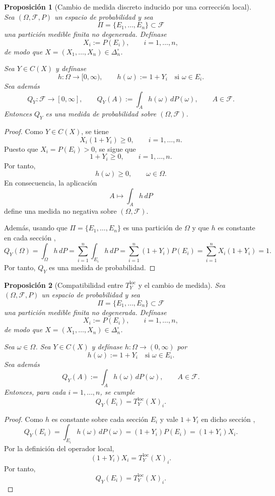 ﻿\documentclass[12pt]{article}
\newtheorem{proposicion}{Proposición}[section]
\begin{document}
\begin{proposicion}[Cambio de medida discreto inducido por una corrección local]\label{prop:QYprobabilidad}
Sea $(\Omega,\mathcal F,P)$ un espacio de probabilidad y sea
\[
\Pi=\{E_1,\dots,E_n\}\subset\mathcal F
\]
una partición medible finita no degenerada. Defínase
\[
X_i:=P(E_i),\qquad i=1,\dots,n,
\]
de modo que $X=(X_1,\dots,X_n)\in\Delta_n^\circ$.

Sea $Y\in C(X)$ y defínase
\[
h:\Omega\to[0,\infty),
\qquad
h(\omega):=1+Y_i
\quad\text{si }\omega\in E_i.
\]
Sea además
\[
Q_Y:\mathcal F\to[0,\infty],
\qquad
Q_Y(A):=\int_A h(\omega)\,dP(\omega),
\qquad A\in\mathcal F.
\]
Entonces $Q_Y$ es una medida de probabilidad sobre $(\Omega,\mathcal F)$.
\end{proposicion}

\begin{proof}
Como $Y\in C(X)$, se tiene
\[
X_i(1+Y_i)\ge 0,\qquad i=1,\dots,n.
\]
Puesto que $X_i=P(E_i)>0$, se sigue que
\[
1+Y_i\ge 0,\qquad i=1,\dots,n.
\]
Por tanto,
\[
h(\omega)\ge 0,\qquad \omega\in\Omega.
\]
En consecuencia, la aplicación
\[
A\mapsto \int_A h\,dP
\]
define una medida no negativa sobre $(\Omega,\mathcal F)$.

Además, usando que $\Pi=\{E_1,\dots,E_n\}$ es una partición de $\Omega$ y que $h$ es constante en cada sección ,
\[
Q_Y(\Omega)
=
\int_\Omega h\,dP
=
\sum_{i=1}^n \int_{E_i} h\,dP
=
\sum_{i=1}^n (1+Y_i)P(E_i)
=
\sum_{i=1}^n X_i(1+Y_i)
=
1.
\]
Por tanto, $Q_Y$ es una medida de probabilidad.
\end{proof}

\begin{proposicion}[Compatibilidad entre $T_Y^{\mathrm{loc}}$ y el cambio de medida]\label{prop:compatibilidadCambioMedida}
Sea $(\Omega,\mathcal F,P)$ un espacio de probabilidad y sea
\[
\Pi=\{E_1,\dots,E_n\}\subset\mathcal F
\]
una partición medible finita no degenerada. Defínase
\[
X_i:=P(E_i),\qquad i=1,\dots,n,
\]
de modo que $X=(X_1,\dots,X_n)\in\Delta_n^\circ$.

Sea $\omega \in \Omega$. Sea $Y \in C(X)$ y defínase $h:\Omega \to (0,\infty)$ por
\[
h(\omega):=1+Y_i \quad \text{si } \omega \in E_i.
\]
Sea además
\[
Q_Y(A):=\int_A h(\omega)\,dP(\omega),
\qquad A\in\mathcal F.
\]
Entonces, para cada $i=1,\dots,n$, se cumple
\[
Q_Y(E_i)=T_Y^{\mathrm{loc}}(X)_i.
\]
\end{proposicion}

\begin{proof}
Como $h$ es constante sobre cada sección  $E_i$ y vale $1+Y_i$ en dicho sección ,
\[
Q_Y(E_i)
=
\int_{E_i} h(\omega)\,dP(\omega)
=
(1+Y_i)P(E_i)
=
(1+Y_i)X_i.
\]
Por la definición del operador local,
\[
(1+Y_i)X_i=T_Y^{\mathrm{loc}}(X)_i.
\]
Por tanto,
\[
Q_Y(E_i)=T_Y^{\mathrm{loc}}(X)_i.
\]
\end{proof}
\end{document}
